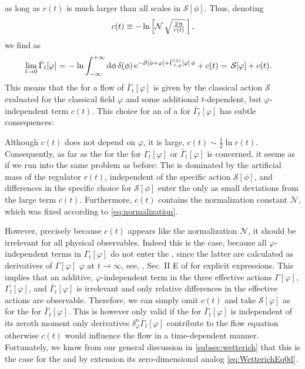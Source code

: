 as long as $r ( t )$ is much larger than all scales in $\mathcal{S} [ \phi ]$.
Thus, denoting
\begin{align}
	c ( t ) \equiv - \ln \Big[ \mathcal{N} \, \sqrt{\tfrac{2\mkern1.0mu\uppi\mkern1.0mu}{r ( t )}} \, \Big] \, ,
\end{align}
we find as 
\begin{align}
	\lim_{t\rightarrow 0}\bar{\Gamma}_t [\varphi] = \, & - \ln \int_{-\infty}^{+\infty} \dif \phi \, \delta(\phi) \, \eu^{ - \mathcal{S}[\phi + \varphi] + \bar{\Gamma}^{(1)}_{t,\varphi}[\varphi] \, \phi } + c ( t ) = \, \mathcal{S}[\varphi] + c ( t ).	\label{eq:initial_condition_gamma}
\end{align}
This means that the \ic{} for a flow of $\bar{\Gamma}_t [ \varphi ]$ is given by the classical action $\mathcal{S}$ evaluated for the classical field $\varphi$ and some additional $t$-dependent, but $\varphi$-independent term $c ( t )$.
This choice for an \ic{} of a \pde{} for $\bar{\Gamma}_t [ \varphi ]$ has subtle consequences:

Although $c ( t )$ does not depend on $\varphi$, it is large, $c ( t ) \sim  \frac{1}{2} \ln r ( t )$.
Consequently, as far as the \ic{} for the \pde{} for $\Gamma_t[\varphi]$ or $\bar{\Gamma}_t[\varphi]$ is concerned, it seems as if we run into the same problem as before:
The \ic{} is dominated by the artificial mass of the regulator $r ( t )$, independent of the specific action $\mathcal{S} [ \phi ]$, and differences in the specific choice for $\mathcal{S} [ \phi ]$ enter the \ic{} only as small deviations from the large term $c ( t )$.
Furthermore, $c ( t )$ contains the normalization constant $\mathcal{N}$, which was fixed according to \cref{eq:normalization}.

However, precisely because $c ( t )$ appears like the normalization $\mathcal{N}$, it should be irrelevant for all physical observables.
Indeed this is the case, because all $\varphi$-independent terms in $\Gamma_t [ \varphi ]$ do not enter the \nptFunctions{}, since the latter are calculated as derivatives of $\Gamma [ \varphi ]$ \wrt{} $\varphi$ at $t \rightarrow \infty$, see, \eg{}, Sec. II E of  for explicit expressions.
This implies that an additive, $\varphi$-independent term in the three effective actions $\Gamma [ \varphi ]$, $\Gamma_t [ \varphi ]$, and $\bar{\Gamma}_t [ \varphi ]$ is irrelevant and only relative differences in the effective actions are observable.
Therefore, we can simply omit $c ( t )$ and take $\mathcal{S} [ \varphi ]$ as \ic{} for the \pde{} for $\bar{\Gamma}_t [ \varphi ]$.
This is however only valid if the \pde{} for $\bar{\Gamma}_t [ \varphi ]$ is independent of its zeroth moment \dash{} \viz{} only derivatives $\delta_\varphi^n\bar{\Gamma}_t [ \varphi ]$ contribute to the flow equation \dash{} otherwise $c ( t )$ would influence the flow in a time-dependent manner. 
Fortunately, we know from our general discussion in \cref{subsec:wetterich} that this is the case for the \frgEq{} and by extension its zero-dimensional analog \eqref{eq:WetterichEq0d}.\bigskip

